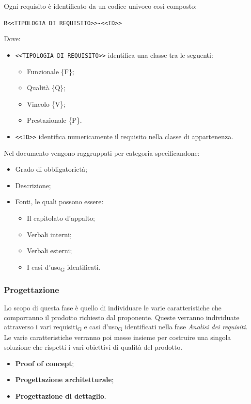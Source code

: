    Ogni requisito è identificato da un codice univoco così composto:
    \begin{center}
		\verb|R<<TIPOLOGIA DI REQUISITO>>-<<ID>>|
    \end{center}
    Dove:
    \begin{itemize}
        \item \verb|<<TIPOLOGIA DI REQUISITO>>| identifica una classe tra le seguenti:
        \begin{itemize}
            \item Funzionale \{F\};
            \item Qualità \{Q\};
            \item Vincolo \{V\};
            \item Prestazionale \{P\}.
        \end{itemize}
        \item \verb|<<ID>>| identifica numericamente il requisito nella classe di appartenenza.
    \end{itemize}
    Nel documento vengono raggruppati per categoria specificandone:
    \begin{itemize}
        \item Grado di obbligatorietà;
        \item Descrizione;
        \item Fonti, le quali possono essere:
        \begin{itemize}
        	\item Il capitolato d'appalto;
        	\item Verbali interni;
        	\item Verbali esterni;
        	\item I casi d'uso\textsubscript{G} identificati.
        \end{itemize}
    \end{itemize}
	
	
	\subsubsection{Progettazione}
	Lo scopo di questa fase è quello di individuare le varie caratteristiche che comporranno il prodotto richiesto dal proponente. Queste verranno individuate attraverso i vari requisiti\textsubscript{G} e casi d'uso\textsubscript{G} identificati nella fase \textit{Analisi dei requisiti}. Le varie caratteristiche verranno poi messe insieme per costruire una singola soluzione che rispetti i vari obiettivi di qualità del prodotto.
	\:
	\begin{itemize}
		\item \textbf{Proof of concept};
		\item \textbf{Progettazione architetturale};
		\item \textbf{Progettazione di dettaglio}.
	\end{itemize}
